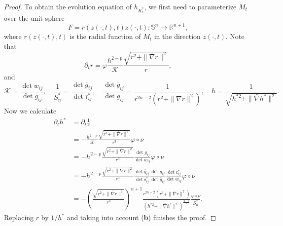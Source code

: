 \documentclass{amsart}
\theoremstyle{definition}
\theoremstyle{remark}
\numberwithin{equation}{section}
\begin{document}
\begin{proof}
To obtain the evolution equation of $h_{K_t^{\ast}}$, we first need to parameterize $M_t$ over the unit sphere
\[F=r(z(\cdot,t),t)z(\cdot,t):\mathbb{S}^{n}\to\mathbb{R}^{n+1},\]
where $r(z(\cdot,t),t)$ is the radial function of $M_t$ in the direction $z(\cdot,t).$
Note that
\[\partial_t r=\varphi \frac{h^{2-p}}{\mathcal{K}}\frac{\sqrt{r^2+\|\bar{\nabla}r\|^2}}{r},\]
and
\[\mathcal{K}=\frac{\det w_{ij}}{\det g_{ij}},\quad \frac{1}{S_n^{\ast}}=\frac{\det \bar{g}_{ij}}{\det \mathfrak{r}_{ij}^{\ast}},\quad \frac{\det \bar{g}_{ij}}{\det g_{ij}}=\frac{1}{r^{2n-2}(r^2+\|\bar{\nabla}r\|^2)},
\quad h=\frac{1}{\sqrt{h^{\ast 2}+\|\bar{\nabla}h^{\ast}\|^2}}.\]
Now we calculate
\begin{align*}
\partial_t h^{\ast}&=\partial_t \frac{1}{r}\\
&=- \frac{h^{2-p}}{\mathcal{K}}\frac{\sqrt{r^2+\|\bar{\nabla}r\|^2}}{r^3}\varphi\circ\nu\\
&=-h^{2-p}\frac{\sqrt{r^2+\|\bar{\nabla}r\|^2}}{r^3}\frac{\det g_{ij}}{\det w_{ij}}\varphi\circ\nu\\
&=-h^{2-p}\frac{\sqrt{r^2+\|\bar{\nabla}r\|^2}}{r^3}\frac{\det \bar{g}_{ij}}{\det \mathfrak{r}_{ij}^{\ast}}\frac{\det g_{ij}}{\det \bar{g}_{ij}}\frac{\det \mathfrak{r}_{ij}^{\ast}}{\det w_{ij}}\varphi\circ\nu\\
&=-\left(\frac{\sqrt{r^2+\|\bar{\nabla}r\|^2}}{r^3}\right)^{n+1}\frac{r^{2n-2}(r^2+\|\bar{\nabla}r\|^2)}{(h^{\ast 2}+\|\bar{\nabla}h^{\ast}\|^2)^{\frac{2-p}{2}}}\frac{\varphi\circ\nu}{S_n^{\ast}}.
\end{align*}
Replacing $r$ by $1/h^{\ast}$ and taking into account (\textbf{b}) finishes the proof.
\end{proof}
\end{document}
